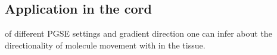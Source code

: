 \subsection*{Application in the cord}

 of different \gls{PGSE} settings and gradient direction one can infer about the directionality of molecule movement with in the tissue. 

% 
% 
% 
% 
% 
% 
% 
% 
